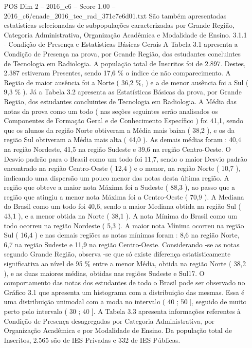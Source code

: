 \begin{textsample}{POS Dim 2 – 2016\_c6 – Score 1.00 – 2016\_c6/enade\_2016\_tec\_rad\_371c7e6d01.txt}
São também apresentadas estatísticas selecionadas de subpopulações caracterizadas por Grande Região, Categoria Administrativa, Organização Acadêmica e Modalidade de Ensino. 3.1.1 - Condição de Presença e Estatísticas Básicas Gerais A Tabela 3.1 apresenta a Condição de Presença na prova, por Grande Região, dos estudantes concluintes de Tecnologia em Radiologia.
A população total de Inscritos foi de 2.897.
Destes, 2.387 estiveram Presentes, sendo 17,6 \% o índice de não comparecimento.
A Região de maior ausência foi a Norte ( 36,2 \%, ) e a de menor ausência foi a Sul ( 9,3 \% ).
Já a Tabela 3.2 apresenta as Estatísticas Básicas da prova, por Grande Região, dos estudantes concluintes de Tecnologia em Radiologia.
A Média das notas da prova como um todo ( nas seções seguintes serão analisados os Componentes de Formação Geral e de Conhecimento Específico ) foi 41,1, sendo que os alunos da região Norte obtiveram a Média mais baixa ( 38,2 ), e os da região Sul obtiveram a Média mais alta ( 44,0 ).
As demais médias foram : 40,4 na região Nordeste, 41,5 na região Sudeste e 39,6 na região Centro-Oeste.
O Desvio padrão para o Brasil como um todo foi 11,7, sendo o maior Desvio padrão encontrado na região Centro-Oeste ( 12,4 ) e o menor, na região Norte ( 10,7 ), indicando uma dispersão um pouco menor das notas desta última região.
A região que obteve a maior nota Máxima foi a Sudeste ( 88,3 ), ao passo que a região que atingiu a menor nota Máxima foi a Centro-Oeste ( 70,9 ).
A Mediana do Brasil como um todo foi 40,6, sendo a maior Mediana obtida na região Sul ( 43,1 ), e a menor obtida na Norte ( 38,1 ).
A nota Mínima do Brasil como um todo ocorreu na região Nordeste ( 5,3 ).
A maior nota Mínima ocorreu na região Sul ( 16,4 ) e nas demais regiões as notas mínimas foram : 8,6 na região Norte, 6,7 na região Sudeste e 11,9 na região Centro-Oeste.
Considerando -se as notas segundo Grande Região, observa -se que só existe diferença estatisticamente significativa ao nível de 95 \% entre a menor Média, obtida na região Norte ( 38,2 ), e as duas maiores médias, obtidas nas regiões Sudeste e Sul17.
O comportamento das notas dos estudantes de todo o Brasil pode ser observado no Gráfico 3.1 que apresenta um histograma com a distribuição das mesmas.
Essa é uma distribuição unimodal com a moda no intervalo ( 40 ; 50 ], seguido de muito perto pelo intervalo ( 30 ; 40 ].
A Tabela 3.3 apresenta informações referentes à Condição de Presença desagregadas por Categoria Administrativa, por Organização Acadêmica e por Modalidade de Ensino.
Da população total de Inscritos, 2.565 são de IES Privadas e 332 de IES Públicas.

\end{textsample}
